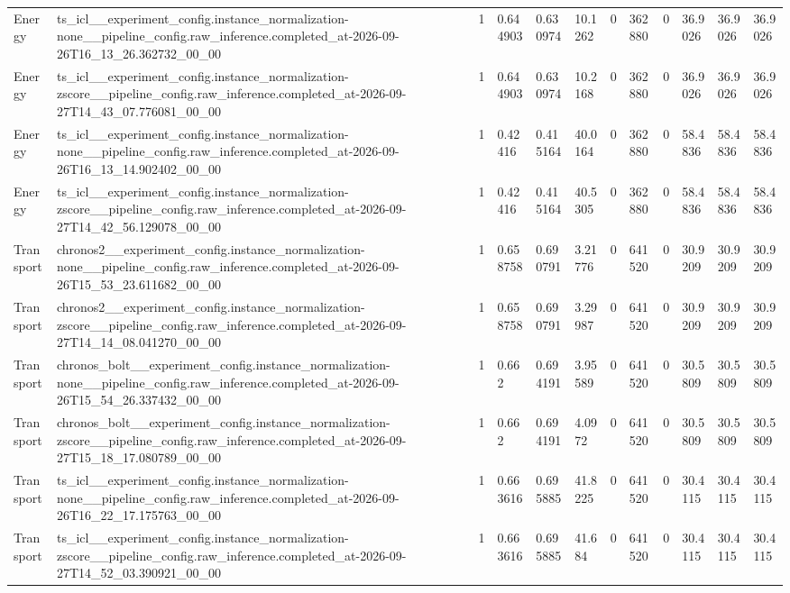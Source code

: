 \begin{tabular}{llllllllllll}
Energy & ts\_icl\_\_experiment\_config.instance\_normalization-none\_\_pipeline\_config.raw\_inference.completed\_at-2026-09-26T16\_13\_26.362732\_00\_00 & 1 & 0.644903 & 0.630974 & 10.1262 & 0 & 362880 & 0 & 36.9026 & 36.9026 & 36.9026 \\
Energy & ts\_icl\_\_experiment\_config.instance\_normalization-zscore\_\_pipeline\_config.raw\_inference.completed\_at-2026-09-27T14\_43\_07.776081\_00\_00 & 1 & 0.644903 & 0.630974 & 10.2168 & 0 & 362880 & 0 & 36.9026 & 36.9026 & 36.9026 \\
Energy & ts\_icl\_\_experiment\_config.instance\_normalization-none\_\_pipeline\_config.raw\_inference.completed\_at-2026-09-26T16\_13\_14.902402\_00\_00 & 1 & 0.42416 & 0.415164 & 40.0164 & 0 & 362880 & 0 & 58.4836 & 58.4836 & 58.4836 \\
Energy & ts\_icl\_\_experiment\_config.instance\_normalization-zscore\_\_pipeline\_config.raw\_inference.completed\_at-2026-09-27T14\_42\_56.129078\_00\_00 & 1 & 0.42416 & 0.415164 & 40.5305 & 0 & 362880 & 0 & 58.4836 & 58.4836 & 58.4836 \\
Transport & chronos2\_\_experiment\_config.instance\_normalization-none\_\_pipeline\_config.raw\_inference.completed\_at-2026-09-26T15\_53\_23.611682\_00\_00 & 1 & 0.658758 & 0.690791 & 3.21776 & 0 & 641520 & 0 & 30.9209 & 30.9209 & 30.9209 \\
Transport & chronos2\_\_experiment\_config.instance\_normalization-zscore\_\_pipeline\_config.raw\_inference.completed\_at-2026-09-27T14\_14\_08.041270\_00\_00 & 1 & 0.658758 & 0.690791 & 3.29987 & 0 & 641520 & 0 & 30.9209 & 30.9209 & 30.9209 \\
Transport & chronos\_bolt\_\_experiment\_config.instance\_normalization-none\_\_pipeline\_config.raw\_inference.completed\_at-2026-09-26T15\_54\_26.337432\_00\_00 & 1 & 0.662 & 0.694191 & 3.95589 & 0 & 641520 & 0 & 30.5809 & 30.5809 & 30.5809 \\
Transport & chronos\_bolt\_\_experiment\_config.instance\_normalization-zscore\_\_pipeline\_config.raw\_inference.completed\_at-2026-09-27T15\_18\_17.080789\_00\_00 & 1 & 0.662 & 0.694191 & 4.0972 & 0 & 641520 & 0 & 30.5809 & 30.5809 & 30.5809 \\
Transport & ts\_icl\_\_experiment\_config.instance\_normalization-none\_\_pipeline\_config.raw\_inference.completed\_at-2026-09-26T16\_22\_17.175763\_00\_00 & 1 & 0.663616 & 0.695885 & 41.8225 & 0 & 641520 & 0 & 30.4115 & 30.4115 & 30.4115 \\
Transport & ts\_icl\_\_experiment\_config.instance\_normalization-zscore\_\_pipeline\_config.raw\_inference.completed\_at-2026-09-27T14\_52\_03.390921\_00\_00 & 1 & 0.663616 & 0.695885 & 41.684 & 0 & 641520 & 0 & 30.4115 & 30.4115 & 30.4115 \\

\end{tabular}

